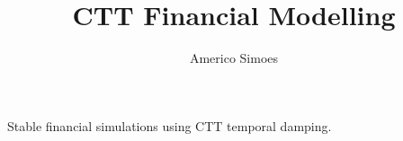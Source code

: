 \documentclass[12pt]{article}
\begin{document}
\title{CTT Financial Modelling}
\author{Americo Simoes}
\maketitle
Stable financial simulations using CTT temporal damping.
\end{document}
